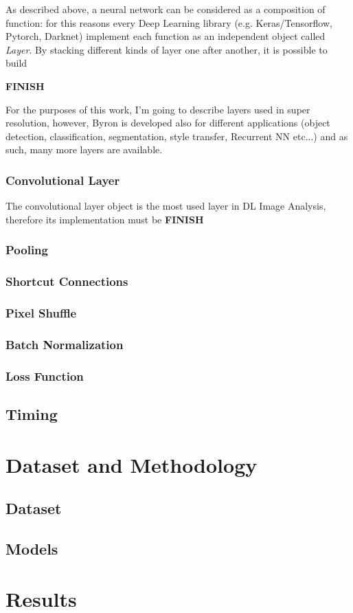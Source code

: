 \documentclass[12pt,a4paper]{report}
\begin{document}
As described above, a neural network can be considered as a composition of function: for this reasons every Deep Learning library (e.g. Keras/Tensorflow, Pytorch, Darknet) implement each function as an independent object called {\it Layer}. 
By stacking different kinds of layer one after another, it is possible to build 

{\bf FINISH}

For the purposes of this work, I'm going to describe layers used in super resolution, however, Byron is developed also for different applications (object detection, classification, segmentation, style transfer, Recurrent NN etc...) and as such, many more layers are available.   

\subsection*{Convolutional Layer}

The convolutional layer object is the most used layer in DL Image Analysis, therefore its implementation must be  {\bf FINISH}

\subsection*{Pooling}
\subsection*{Shortcut Connections}
\subsection*{Pixel Shuffle}
\subsection*{Batch Normalization}
\subsection*{Loss Function}
\section{Timing}
\section{}

\chapter{Dataset and Methodology}

\section{Dataset}

\section{Models}

\chapter{Results}


\newpage
\nocite{*}


\end{document}
